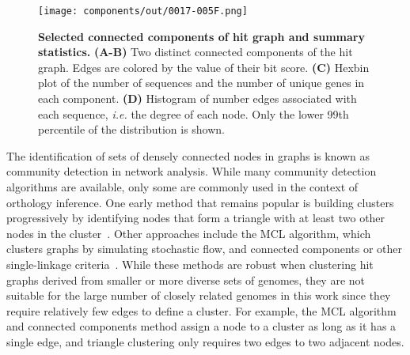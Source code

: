 \begin{figure}[h!]
\texttt{[image: components/out/0017-005F.png]}
\centering
\caption{\textbf{Selected connected components of hit graph and summary statistics.}
\textbf{(A-B)} Two distinct connected components of the hit graph. Edges are colored by the value of their bit score. \textbf{(C)} Hexbin plot of the number of sequences and the number of unique genes in each component. \textbf{(D)} Histogram of number edges associated with each sequence, \textit{i.e.} the degree of each node. Only the lower 99th percentile of the distribution is shown.}
\label{fig:components}
\end{figure}

The identification of sets of densely connected nodes in graphs is known as community detection in network analysis. While many community detection algorithms are available, only some are commonly used in the context of orthology inference. One early method that remains popular is building clusters progressively by identifying nodes that form a triangle with at least two other nodes in the cluster~\cite{Tatusov1997, Jensen2007}. Other approaches include the MCL algorithm, which clusters graphs by simulating stochastic flow, and connected components or other single-linkage criteria~\cite{Remm2001, Enright2002, Li2003, Emms2015, Train2017, Cosentino2018}. While these methods are robust when clustering hit graphs derived from smaller or more diverse sets of genomes, they are not suitable for the large number of closely related genomes in this work since they require relatively few edges to define a cluster. For example, the MCL algorithm and connected components method assign a node to a cluster as long as it has a single edge, and triangle clustering only requires two edges to two adjacent nodes.

